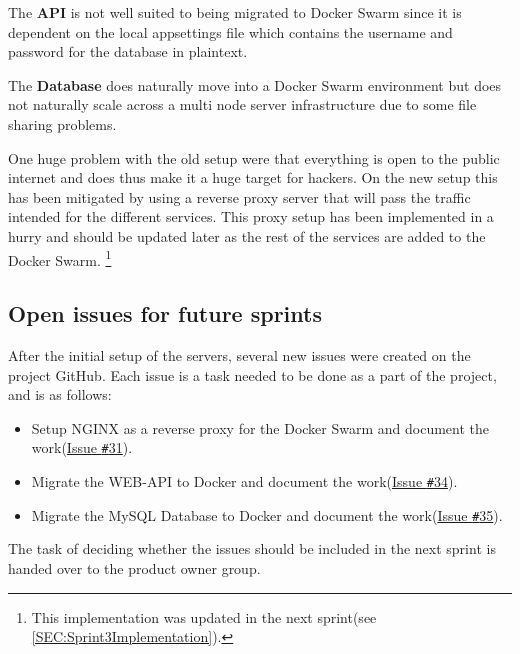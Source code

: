 The \textbf{API} is not well suited to being migrated to Docker Swarm since it is dependent on the local appsettings file which contains the username and password for the database in plaintext.

The \textbf{Database} does naturally move into a Docker Swarm environment but does not naturally scale across a multi node server infrastructure due to some file sharing problems.

One huge problem with the old setup were that everything is open to the public internet and does thus make it a huge target for hackers.
On the new setup this has been mitigated by using a reverse proxy server that will pass the traffic intended for the different services.
This proxy setup has been implemented in a hurry and should be updated later as the rest of the services are added to the Docker Swarm. 
\footnote{This implementation was updated in the next sprint(see \autoref{SEC:Sprint3Implementation}).}

\subsection{Open issues for future sprints}
After the initial setup of the servers, several new issues were created on the project GitHub.
Each issue is a task needed to be done as a part of the project, and is as follows:

\begin{itemize}
\item Setup NGINX as a reverse proxy for the Docker Swarm and document the work(\href{https://github.com/aau-giraf/wiki/issues/31}{Issue \texttt{\#}31}).
\item Migrate the WEB-API to Docker and document the work(\href{https://github.com/aau-giraf/wiki/issues/34}{Issue \texttt{\#}34}).
\item Migrate the MySQL Database to Docker and document the work(\href{https://github.com/aau-giraf/wiki/issues/35}{Issue \texttt{\#}35}).
\end{itemize}

The task of deciding whether the issues should be included in the next sprint is handed over to the product owner group.
